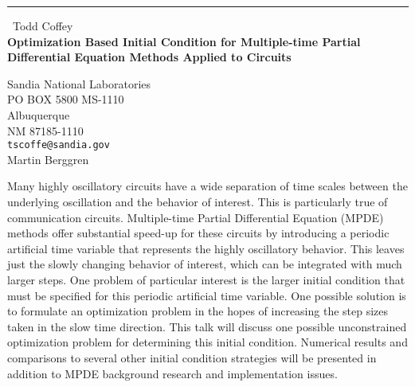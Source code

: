 \documentclass{report}
\begin{document}
\begin{center}
\rule{6in}{1pt} \
{\large Todd Coffey \\
{\bf Optimization Based Initial Condition for Multiple-time Partial Differential Equation Methods Applied to Circuits}}

Sandia National Laboratories \\ PO BOX 5800 MS-1110 \\ Albuquerque \\ NM 87185-1110
\\
{\tt tscoffe@sandia.gov}\\
Martin Berggren\end{center}

Many highly oscillatory circuits have a wide separation of time scales between the underlying oscillation and the behavior of interest.
This is particularly true of communication circuits.
Multiple-time Partial Differential Equation (MPDE) methods offer substantial speed-up for these circuits by introducing a periodic artificial time variable that represents the highly oscillatory behavior.
This leaves just the slowly changing behavior of interest,
which can be integrated with much larger steps.
One problem of particular interest is the larger initial condition that must be specified for this periodic artificial time variable.
One possible solution is to formulate an optimization problem in the hopes of increasing the step sizes taken in the slow time direction.
This talk will discuss one possible unconstrained optimization problem for determining this initial condition.
Numerical results and comparisons to several other initial condition strategies will be presented in addition to MPDE background research and implementation issues.
\end{document}
